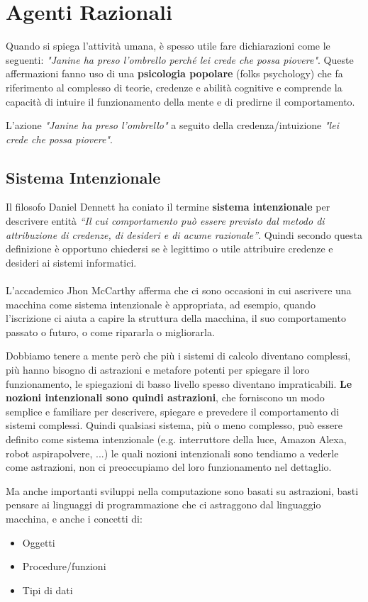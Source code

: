 \section{Agenti Razionali}
Quando si spiega l’attività umana, è spesso utile fare dichiarazioni come le seguenti: \textit{"Janine ha preso l'ombrello perché lei crede che possa piovere"}. Queste affermazioni fanno uso di una \textbf{psicologia popolare} (folks psychology) che fa riferimento al complesso di teorie, credenze e abilità cognitive e comprende la capacità di intuire il funzionamento della mente e di predirne il comportamento.

L'azione \textit{"Janine ha preso l'ombrello"} a seguito della credenza/intuizione \textit{"lei crede che possa piovere"}.

\subsection{Sistema Intenzionale}
Il filosofo Daniel Dennett ha coniato il termine \textbf{sistema intenzionale} per descrivere entità \textit{“Il cui comportamento può essere previsto dal metodo di attribuzione di credenze, di desideri e di acume razionale”}. Quindi secondo questa definizione è opportuno chiedersi se è legittimo o utile attribuire credenze e desideri ai sistemi informatici.
\paragraph{}
L'accademico Jhon McCarthy afferma che ci sono occasioni in cui ascrivere una macchina come sistema intenzionale è appropriata, ad esempio, quando l'iscrizione ci aiuta a capire la struttura della macchina, il suo comportamento passato o futuro, o come ripararla o migliorarla.

Dobbiamo tenere a mente però che più i sistemi di calcolo diventano complessi, più hanno bisogno di astrazioni e metafore potenti per spiegare il loro funzionamento, le spiegazioni di basso livello spesso diventano impraticabili. \textbf{Le nozioni intenzionali sono quindi astrazioni}, che forniscono un modo semplice e familiare per descrivere, spiegare e prevedere il comportamento di sistemi complessi. Quindi qualsiasi sistema, più o meno complesso, può essere definito come sistema intenzionale (e.g. interruttore della luce, Amazon Alexa, robot aspirapolvere, ...) le quali nozioni intenzionali sono tendiamo a vederle come astrazioni, non ci preoccupiamo del loro funzionamento nel dettaglio.

Ma anche importanti sviluppi nella computazione sono basati su astrazioni, basti pensare ai linguaggi di programmazione che ci astraggono dal linguaggio macchina, e anche i concetti di:
\begin{itemize}
    \item Oggetti
    \item Procedure/funzioni
    \item Tipi di dati
\end{itemize}


